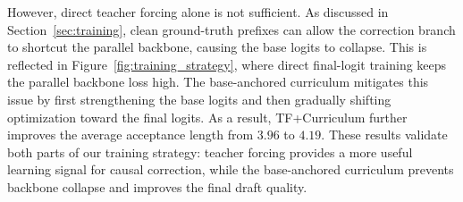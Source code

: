 \documentclass{llmxive}
\providecommand{\arraystretch}{0.92}
\begin{document}
However, direct teacher forcing alone is not sufficient. As discussed in Section~\ref{sec:training}, clean ground-truth prefixes can allow the correction branch to shortcut the parallel backbone, causing the base logits to collapse. This is reflected in Figure~\ref{fig:training_strategy}, where direct final-logit training keeps the parallel backbone loss high. The base-anchored curriculum mitigates this issue by first strengthening the base logits and then gradually shifting optimization toward the final logits. As a result, TF+Curriculum further improves the average acceptance length from \(3.96\) to \(4.19\). These results validate both parts of our training strategy: teacher forcing provides a more useful learning signal for causal correction, while the base-anchored curriculum prevents backbone collapse and improves the final draft quality.
\begin{table}[t]
\centering
\setlength{\tabcolsep}{4pt}
\renewcommand{\arraystretch}{0.95}

\end{table}
\end{document}
